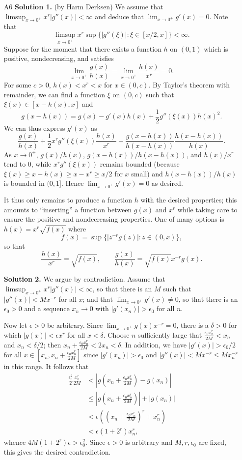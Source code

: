 \documentclass[amssymb,twocolumn,pra,10pt,aps]{revtex4-1}
\begin{document}
\begin{itemize}
\item[A6]
\textbf{Solution 1.}
(by Harm Derksen)
We assume that $\limsup_{x \to 0^+} x^r |g''(x)| < \infty$
and deduce that $\lim_{x \to 0^+} g'(x) = 0$.
Note that
\[
\limsup_{x \to 0^+} x^r \sup\{| g''(\xi)|: \xi \in [x/2, x]\}
< \infty.
\]
Suppose for the moment that there exists a function $h$ on $(0,1)$ which is positive, nondecreasing, and satisfies
\[
\lim_{x \to 0^+} \frac{g(x)}{h(x)} = \lim_{x \to 0^+} \frac{h(x)}{x^r} = 0.
\]
For some $c>0$, $h(x) < x^r < x$ for $x \in (0,c)$. By Taylor's theorem with remainder, we can find a function $\xi$ on $(0,c)$ such that
$\xi(x) \in [x-h(x),x]$ and
\[
g(x-h(x)) = g(x) - g'(x) h(x) + \frac{1}{2} g''(\xi(x)) h(x)^2.
\]
We can thus express $g'(x)$ as
\[
\frac{g(x)}{h(x)} + \frac{1}{2} x^r g''(\xi(x)) \frac{h(x)}{x^r}
-  \frac{g(x-h(x))}{h(x-h(x))} \frac{h(x-h(x))}{h(x)}.
\]
As $x \to 0^+$, $g(x)/h(x)$, $g(x-h(x))/h(x-h(x))$, and
$h(x)/x^r$ tend to 0, while $x^r g''(\xi(x))$ remains bounded
(because $\xi(x) \geq x-h(x) \geq x - x^r \geq x/2$ for $x$ small)
and $h(x-h(x))/h(x)$ is bounded in $(0,1]$.
Hence $\lim_{x \to 0^+} g'(x) = 0$ as desired.

It thus only remains to produce a function $h$ with the desired properties; this amounts to ``inserting'' a function between $g(x)$ and $x^r$ while taking care to ensure the positive and nondecreasing properties.
One of many options is $h(x) = x^r \sqrt{f(x)}$ where
\[
f(x) = \sup\{|z^{-r} g(z)|: z \in (0,x)\},
\]
so that
\[
\frac{h(x)}{x^r} = \sqrt{f(x)}, \qquad \frac{g(x)}{h(x)} = \sqrt{f(x)} x^{-r} g(x).
\]

\noindent
\textbf{Solution 2.}
We argue by contradiction. Assume that $\limsup_{x\to 0^+} x^r|g''(x)|<\infty$, so that there is an $M$ such that $|g''(x)| < M x^{-r}$ for all $x$; and that $\lim_{x\to 0^+} g'(x) \neq 0$, so that there is an $\epsilon_0>0$ and a sequence $x_n\to 0$ with $|g'(x_n)| > \epsilon_0$ for all $n$.

Now let $\epsilon>0$ be arbitrary. Since $\lim_{x\to 0^+} g(x) x^{-r} = 0$, there is a $\delta>0$ for which $|g(x)|<\epsilon x^r$ for all $x<\delta$.
Choose $n$ sufficiently large that $\frac{\epsilon_0 x_n^r}{2M}<x_n$ and $x_n < \delta/2$; then $x_n+\frac{\epsilon_0 x_n^r}{2M} < 2 x_n < \delta$. In addition,
we have $|g'(x)| > \epsilon_0/2$ for all $x\in [x_n,x_n+\frac{\epsilon_0 x_n^r}{2M}]$ since $|g'(x_n)| > \epsilon_0$ and $|g''(x)| < Mx^{-r} \leq M x_n^{-r}$ in this range. It follows that
\begin{align*}
\frac{\epsilon_0^2}{2} \frac{x_n^r}{2M} &<
|g(x_n+\frac{\epsilon_0 x_n^r}{2M}) - g(x_n)| \\
&\leq |g(x_n+\frac{\epsilon_0 x_n^r}{2M})|+|g(x_n)| \\
&< \epsilon \left((x_n+\frac{\epsilon_0 x_n^r}{2M})^r+x_n^r\right) \\
&< \epsilon(1+2^r)x_n^r,
\end{align*}
whence $4M(1+2^r)\epsilon > \epsilon_0^2$. Since $\epsilon>0$ is arbitrary and $M,r,\epsilon_0$ are fixed, this gives the desired contradiction.



\end{itemize}
\end{document}
